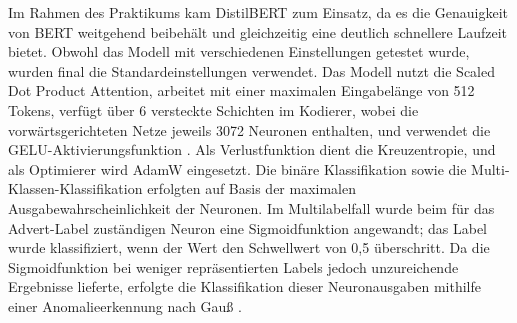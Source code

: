 Im Rahmen des Praktikums kam DistilBERT \cite{Sanh2019} zum Einsatz, da es die Genauigkeit von BERT weitgehend beibehält und gleichzeitig eine deutlich schnellere Laufzeit bietet. Obwohl das Modell mit verschiedenen Einstellungen getestet wurde, wurden final die Standardeinstellungen verwendet. Das Modell nutzt die Scaled Dot Product Attention, arbeitet mit einer maximalen Eingabelänge von 512 Tokens, verfügt über 6 versteckte Schichten im Kodierer, wobei die vorwärtsgerichteten Netze jeweils 3072 Neuronen enthalten, und verwendet die GELU-Aktivierungsfunktion \cite{Hendrycks2016}. Als Verlustfunktion dient die Kreuzentropie, und als Optimierer wird AdamW eingesetzt. Die binäre Klassifikation sowie die Multi-Klassen-Klassifikation erfolgten auf Basis der maximalen Ausgabewahrscheinlichkeit der Neuronen. Im Multilabelfall wurde beim für das Advert-Label zuständigen Neuron eine Sigmoidfunktion angewandt; das Label wurde klassifiziert, wenn der Wert den Schwellwert von 0,5 überschritt. Da die Sigmoidfunktion bei weniger repräsentierten Labels jedoch unzureichende Ergebnisse lieferte, erfolgte die Klassifikation dieser Neuronausgaben mithilfe einer Anomalieerkennung nach Gauß \cite{Mitchell2013}.